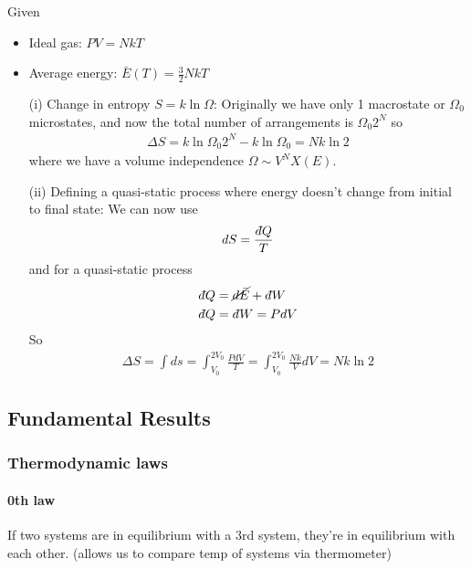 \documentclass[../main.tex]{subfiles}
\begin{document}
Given
\begin{itemize}
    \item Ideal gas: $PV = NkT$
    \item Average energy: $\bar E(T) = \frac{3}{2} Nk T$
\end{itemize}
\begin{enumerate}
    \item [(i)] Change in entropy $S = k \ln \Omega$: Originally we have only 1 macrostate or $\Omega_0$ microstates,
    and now the total number of arrangements is $\Omega_0 2^N$ so
    \begin{align*}
        \Delta S = k \ln \Omega_0 2^N - k \ln \Omega_0 = Nk \ln 2
    \end{align*}
    where we have a volume independence $\Omega \sim V^N X(E)$.
    \item [(ii)] Defining a quasi-static process where energy doesn't change from initial to final state: We can now use
    \begin{align*}
        dS = \frac{d\hspace*{-0.08em}\bar{}\hspace*{0.1em} Q}{T} 
    \end{align*}
    and for a quasi-static process
    \begin{align*}
        d\hspace*{-0.08em}\bar{}\hspace*{0.1em} Q &= \cancel{d\bar E} + d\hspace*{-0.08em}\bar{}\hspace*{0.1em} W \\
        d\hspace*{-0.08em}\bar{}\hspace*{0.1em} Q &= d\hspace*{-0.08em}\bar{}\hspace*{0.1em} W = P dV 
    \end{align*}
    So
    \begin{align*}
        \Delta S = \int ds = \int_{V_0}^{2V_0} \frac{PdV}{T} = \int_{V_0}^{2V_0} \frac{Nk}{V} dV = Nk \ln 2
    \end{align*}
\end{enumerate}

\newpage
{}

\subsection{Fundamental Results}
\subsubsection{Thermodynamic laws}

\paragraph{0th law} If two systems are in equilibrium with a 3rd system,
they're in equilibrium with each other. (allows us to compare temp of systems via thermometer)
\end{document}
